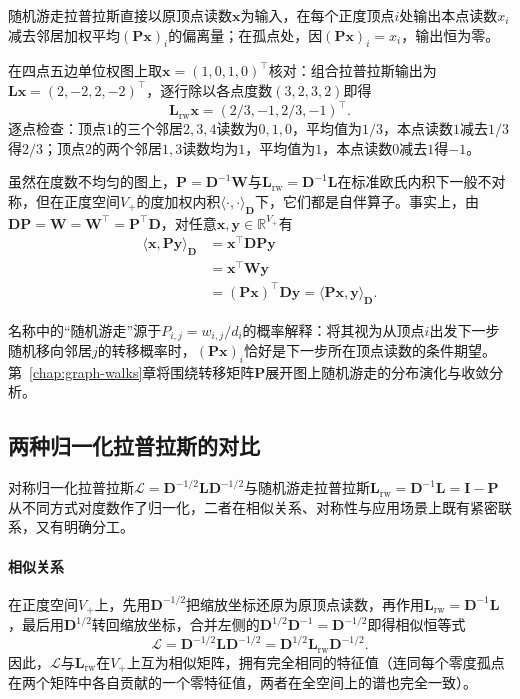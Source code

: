 随机游走拉普拉斯直接以原顶点读数$\bm x$为输入，在每个正度顶点$i$处输出本点读数$x_i$减去邻居加权平均$(\bm P\bm x)_i$的偏离量；在孤点处，因$(\bm P\bm x)_i=x_i$，输出恒为零。

在四点五边单位权图上取$\bm x=(1,0,1,0)^\top$核对：组合拉普拉斯输出为$\bm L\bm x=(2,-2,2,-2)^\top$，逐行除以各点度数$(3,2,3,2)$即得
\[
  \bm L_{\mathrm{rw}}\bm x=(2/3,-1,2/3,-1)^\top.
\]
逐点检查：顶点$1$的三个邻居$2,3,4$读数为$0,1,0$，平均值为$1/3$，本点读数$1$减去$1/3$得$2/3$；顶点$2$的两个邻居$1,3$读数均为$1$，平均值为$1$，本点读数$0$减去$1$得$-1$。

虽然在度数不均匀的图上，$\bm P=\bm D^{-1}\bm W$与$\bm L_{\mathrm{rw}}=\bm D^{-1}\bm L$在标准欧氏内积下一般不对称，但在正度空间$V_+$的度加权内积$\langle\cdot,\cdot\rangle_{\bm D}$下，它们都是自伴算子。事实上，由$\bm D\bm P=\bm W=\bm W^\top=\bm P^\top\bm D$，对任意$\bm x,\bm y\in\mathbb R^{V_+}$有
\[
  \begin{aligned}
    \langle \bm x,\bm P\bm y\rangle_{\bm D}
    &=\bm x^\top\bm D\bm P\bm y\\
    &=\bm x^\top\bm W\bm y\\
    &=(\bm P\bm x)^\top\bm D\bm y
     =\langle \bm P\bm x,\bm y\rangle_{\bm D}.
  \end{aligned}
\]

名称中的“随机游走”源于$P_{i,j}=w_{i,j}/d_i$的概率解释：将其视为从顶点$i$出发下一步随机移向邻居$j$的转移概率时，$(\bm P\bm x)_i$恰好是下一步所在顶点读数的条件期望。第~\ref{chap:graph-walks}章将围绕转移矩阵$\bm P$展开图上随机游走的分布演化与收敛分析。

\subsection{两种归一化拉普拉斯的对比}
\label{sec:graph-normalized-laplacian-comparison}

对称归一化拉普拉斯$\mathcal L=\bm D^{-1/2}\bm L\bm D^{-1/2}$与随机游走拉普拉斯$\bm L_{\mathrm{rw}}=\bm D^{-1}\bm L=\bm I-\bm P$从不同方式对度数作了归一化，二者在相似关系、对称性与应用场景上既有紧密联系，又有明确分工。

\paragraph{相似关系}
在正度空间$V_+$上，先用$\bm D^{-1/2}$把缩放坐标还原为原顶点读数，再作用$\bm L_{\mathrm{rw}}=\bm D^{-1}\bm L$，最后用$\bm D^{1/2}$转回缩放坐标，合并左侧的$\bm D^{1/2}\bm D^{-1}=\bm D^{-1/2}$即得相似恒等式
\begin{equation}
  \mathcal L=\bm D^{-1/2}\bm L\bm D^{-1/2}=\bm D^{1/2}\bm L_{\mathrm{rw}}\bm D^{-1/2}.
  \label{eq:graph-normalized-laplacian-similarity}
\end{equation}
因此，$\mathcal L$与$\bm L_{\mathrm{rw}}$在$V_+$上互为相似矩阵，拥有完全相同的特征值（连同每个零度孤点在两个矩阵中各自贡献的一个零特征值，两者在全空间上的谱也完全一致）。

